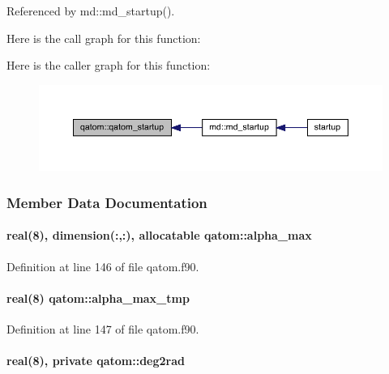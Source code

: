 Referenced by md\-::md\-\_\-startup().



Here is the call graph for this function\-:




Here is the caller graph for this function\-:
\nopagebreak
\begin{figure}[H]
\begin{center}
\leavevmode
\includegraphics[width=350pt]{classqatom_ad48fcf42edfdf81acc64377a370ad3e7_icgraph}
\end{center}
\end{figure}




\subsubsection{Member Data Documentation}
\hypertarget{classqatom_a539962282a5ac4df02663098dd0b9c28}{
\paragraph[{alpha\-\_\-max}]{\setlength{\rightskip}{0pt plus 5cm}real(8), dimension(\-:,\-:), allocatable qatom\-::alpha\-\_\-max}}\label{classqatom_a539962282a5ac4df02663098dd0b9c28}


Definition at line 146 of file qatom.\-f90.

\hypertarget{classqatom_a1c31e7a76874fa00e07aa110513040f4}{
\paragraph[{alpha\-\_\-max\-\_\-tmp}]{\setlength{\rightskip}{0pt plus 5cm}real(8) qatom\-::alpha\-\_\-max\-\_\-tmp}}\label{classqatom_a1c31e7a76874fa00e07aa110513040f4}


Definition at line 147 of file qatom.\-f90.

\hypertarget{classqatom_afa086ac14fec6687dfcc7f13d5cd599f}{
\paragraph[{deg2rad}]{\setlength{\rightskip}{0pt plus 5cm}real(8), private qatom\-::deg2rad\hspace{0.3cm}{\ttfamily [private]}}}\label{classqatom_afa086ac14fec6687dfcc7f13d5cd599f}


